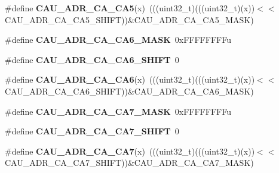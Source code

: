 \begin{DoxyCompactItemize}
\item 
\#define {\bfseries C\+A\+U\+\_\+\+A\+D\+R\+\_\+\+C\+A\+\_\+\+C\+A5}(x)~(((uint32\+\_\+t)(((uint32\+\_\+t)(x))$<$$<$C\+A\+U\+\_\+\+A\+D\+R\+\_\+\+C\+A\+\_\+\+C\+A5\+\_\+\+S\+H\+I\+FT))\&C\+A\+U\+\_\+\+A\+D\+R\+\_\+\+C\+A\+\_\+\+C\+A5\+\_\+\+M\+A\+SK)\hypertarget{group__CAU__Register__Masks_ga6ae6602ea7315196a1bc280b23243325}{}\label{group__CAU__Register__Masks_ga6ae6602ea7315196a1bc280b23243325}

\item 
\#define {\bfseries C\+A\+U\+\_\+\+A\+D\+R\+\_\+\+C\+A\+\_\+\+C\+A6\+\_\+\+M\+A\+SK}~0x\+F\+F\+F\+F\+F\+F\+F\+Fu\hypertarget{group__CAU__Register__Masks_gaadd7000eac5326b13aa96c5823005731}{}\label{group__CAU__Register__Masks_gaadd7000eac5326b13aa96c5823005731}

\item 
\#define {\bfseries C\+A\+U\+\_\+\+A\+D\+R\+\_\+\+C\+A\+\_\+\+C\+A6\+\_\+\+S\+H\+I\+FT}~0\hypertarget{group__CAU__Register__Masks_gad8dbe87fc33b130d08642de3a23246a2}{}\label{group__CAU__Register__Masks_gad8dbe87fc33b130d08642de3a23246a2}

\item 
\#define {\bfseries C\+A\+U\+\_\+\+A\+D\+R\+\_\+\+C\+A\+\_\+\+C\+A6}(x)~(((uint32\+\_\+t)(((uint32\+\_\+t)(x))$<$$<$C\+A\+U\+\_\+\+A\+D\+R\+\_\+\+C\+A\+\_\+\+C\+A6\+\_\+\+S\+H\+I\+FT))\&C\+A\+U\+\_\+\+A\+D\+R\+\_\+\+C\+A\+\_\+\+C\+A6\+\_\+\+M\+A\+SK)\hypertarget{group__CAU__Register__Masks_ga51577142dfe928002db306968d2d04c4}{}\label{group__CAU__Register__Masks_ga51577142dfe928002db306968d2d04c4}

\item 
\#define {\bfseries C\+A\+U\+\_\+\+A\+D\+R\+\_\+\+C\+A\+\_\+\+C\+A7\+\_\+\+M\+A\+SK}~0x\+F\+F\+F\+F\+F\+F\+F\+Fu\hypertarget{group__CAU__Register__Masks_ga2ea865f0bce0752907d3cf74be39c6fc}{}\label{group__CAU__Register__Masks_ga2ea865f0bce0752907d3cf74be39c6fc}

\item 
\#define {\bfseries C\+A\+U\+\_\+\+A\+D\+R\+\_\+\+C\+A\+\_\+\+C\+A7\+\_\+\+S\+H\+I\+FT}~0\hypertarget{group__CAU__Register__Masks_ga8bee4c551567070e18a1ed1cc5898e8f}{}\label{group__CAU__Register__Masks_ga8bee4c551567070e18a1ed1cc5898e8f}

\item 
\#define {\bfseries C\+A\+U\+\_\+\+A\+D\+R\+\_\+\+C\+A\+\_\+\+C\+A7}(x)~(((uint32\+\_\+t)(((uint32\+\_\+t)(x))$<$$<$C\+A\+U\+\_\+\+A\+D\+R\+\_\+\+C\+A\+\_\+\+C\+A7\+\_\+\+S\+H\+I\+FT))\&C\+A\+U\+\_\+\+A\+D\+R\+\_\+\+C\+A\+\_\+\+C\+A7\+\_\+\+M\+A\+SK)\hypertarget{group__CAU__Register__Masks_gaac9f48ae12da632ac356d3024c5a1ff0}{}\label{group__CAU__Register__Masks_gaac9f48ae12da632ac356d3024c5a1ff0}


\end{DoxyCompactItemize}
